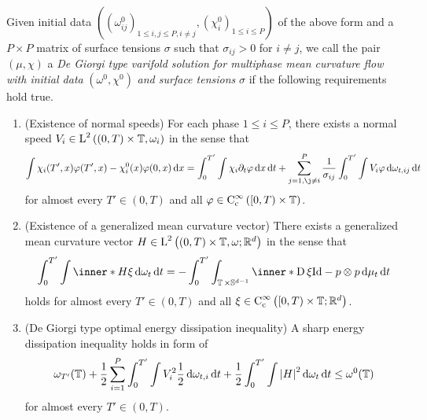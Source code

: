 \begin{definition}
	Given initial data 
	$ (
		( \omega^{ 0 }_{ i j } )_{ 1 \leq i , j \leq P, i \neq j },
		( \chi_{ i}^{ 0 } )_{ 1 \leq i \leq P}
	) $
	of the above form and a $ P \times P $ matrix of surface tensions $ \sigma 
	$ such that $ \sigma_{ i j } > 0 $ for $ i \neq j 
	$, we call the pair $ \left( \mu , \chi \right) $ a
	\emph{De Giorgi type varifold solution for multiphase mean curvature flow 
	with initial data} $ ( \omega^{ 0 } , \chi^{ 0 } ) $ \emph{and surface 
	tensions} $ \sigma $ if the following requirements hold true.
	\begin{enumerate}
		\item (Existence of normal speeds)
		For each phase $ 1 \leq i \leq P $, there exists a normal speed
		$ V_{ i } \in \operatorname{L}^{ 2 } \left(
			( 0 , T ) \times \operatorname{\mathbb{T}}, \omega_{ i } \right) $ in the sense 
			that
		\begin{equation}
			\label{equation_varifold_velocity_multiphase}
			\int
				\chi_{ i } ( T', x ) \varphi ( T', x ) 
				-
				\chi_{ i }^{ 0 } ( x ) \varphi ( 0 , x )
			\dd{ x }
			=
			\int_{ 0 }^{ T' }
				\int
					\chi_{ i }
					\partial_{ t } \varphi
				\dd{ x }
			\dd{ t }
			+
			\sum_{ j =1, \j \neq i  }^{ P }
				\frac{ 1 }{ \sigma_{ i j } }
				\int_{ 0 }^{ T' }
					\int
						V_{ i }
						\varphi
					\dd{ \omega_{ t , i j } }
				\dd{ t }
		\end{equation}
		for almost every $ T' \in ( 0 , T ) $ and all $ \varphi \in \operatorname{C}_{ 
		\mathrm{c} }^{ \infty } \left( [ 0 , T ) \times \operatorname{\mathbb{T}}\right) 
		$.
		
	\item (Existence of a generalized mean curvature vector)
	There exists a generalized mean curvature vector 
	$ H \in \operatorname{L}^{ 2 } \left(
		( 0 , T )\times \operatorname{\mathbb{T}} , \omega; \mathbb{ R }^{ d } \right)
	 $
	in the sense that
	\begin{equation}
		\label{equation_varifold_mean_curvature_multiphase}
		\int_{ 0 }^{ T' }
			\int
				\inner*{ H }{ \xi }
			\dd{ \omega_{ t } }
		\dd{ t }
		=
		-
		\int_{ 0 }^{ T' }
			\int_{ \flattorus \times \mathbb{ S }^{ d - 1 } }
				\inner*{ \diff \xi }
				{ \mathrm{Id} - p \otimes p }
			\dd{ \mu_{ t } }
		\dd{ t }
	\end{equation}
	holds for almost every $ T' \in ( 0 , T ) $ and all $ \xi \in \operatorname{C}_{ 
	\mathrm{c} }^{ \infty } \left( [ 0 , T ) \times \operatorname{\mathbb{T}} ; \mathbb{ 
	R }^{ d } \right) $.
	
	\item (De Giorgi type optimal energy dissipation inequality)
	A sharp energy dissipation inequality holds in form of
	\begin{equation}
		\label{equation_varifold_energy_dissipation_inequality}
		\omega_{ T' } ( \operatorname{\mathbb{T}} )
		+
		\frac{ 1 }{ 2 }
		\sum_{ i = 1 }^{ P }
			\int_{ 0 }^{ T' }
				\int
					V_{ i }^{ 2 }
					\frac{ 1 }{ 2 }
				\dd{ \omega_{ t , i } }
			\dd{ t }
		+
		\frac{ 1 }{ 2 }
		\int_{ 0 }^{ T' }
			\int
				\abs{ H }^{ 2 }
			\dd{ \omega_{ t } }
		\dd{ t }
		\leq
		\omega^{ 0 } ( \operatorname{\mathbb{T}} )
	\end{equation}
	for almost every $ T' \in ( 0 , T ) $.
	

\end{enumerate}
\end{definition}
